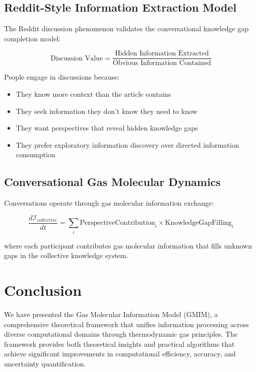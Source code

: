 \documentclass[11pt,a4paper]{article}
\begin{document}
\subsection{Reddit-Style Information Extraction Model}

The Reddit discussion phenomenon validates the conversational knowledge gap completion model:

\begin{equation}
\text{Discussion Value} = \frac{\text{Hidden Information Extracted}}{\text{Obvious Information Contained}}
\end{equation}

People engage in discussions because:
\begin{itemize}
\item They know more context than the article contains
\item They seek information they don't know they need to know
\item They want perspectives that reveal hidden knowledge gaps
\item They prefer exploratory information discovery over directed information consumption
\end{itemize}

\subsection{Conversational Gas Molecular Dynamics}

Conversations operate through gas molecular information exchange:

\begin{equation}
\frac{d\mathcal{I}_{collective}}{dt} = \sum_{i} \text{PerspectiveContribution}_i \times \text{KnowledgeGapFilling}_i
\end{equation}

where each participant contributes gas molecular information that fills unknown gaps in the collective knowledge system.

\section{Conclusion}

We have presented the Gas Molecular Information Model (GMIM), a comprehensive theoretical framework that unifies information processing across diverse computational domains through thermodynamic gas principles. The framework provides both theoretical insights and practical algorithms that achieve significant improvements in computational efficiency, accuracy, and uncertainty quantification.
\end{document}
